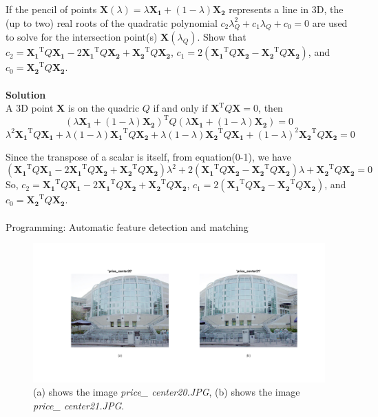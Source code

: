 \documentclass{assignment}
\begin{document}
\begin{problemlist}
If the pencil of points $\mathbf{X}(\lambda) = \lambda\mathbf{X_1} + (1 - \lambda)\mathbf{X_2}$ represents a line in 3D, the (up to two) real roots of the quadratic polynomial $c_2\lambda_Q^2+c_1\lambda_Q+c_0=0$ are used to solve for the intersection point(s) $\mathbf{X}(\lambda_Q)$. Show that $c_2=\mathbf{X_1}^\mathrm{T}Q\mathbf{X_1}-2\mathbf{X_1}^\mathrm{T}Q\mathbf{X_2}+\mathbf{X_2}^\mathrm{T}Q\mathbf{X_2}$, $c_1=2(\mathbf{X_1}^\mathrm{T}Q\mathbf{X_2}-\mathbf{X_2}^\mathrm{T}Q\mathbf{X_2})$, and $c_0=\mathbf{X_2}^\mathrm{T}Q\mathbf{X_2}$.
\\\\
\textbf{Solution}\\
A 3D point $\mathbf{X}$ is on the quadric $Q$ if and only if $\mathbf{X}^\mathrm{T}Q\mathbf{X}=0$, then
\begin{equation}
(\lambda\mathbf{X_1} + (1 - \lambda)\mathbf{X_2})^\mathrm{T}Q(\lambda\mathbf{X_1} + (1 - \lambda)\mathbf{X_2})=0
\end{equation}
\begin{equation}
\lambda^2\mathbf{X_1}^\mathrm{T}Q\mathbf{X_1}+
\lambda(1-\lambda)\mathbf{X_1}^\mathrm{T}Q\mathbf{X_2}+
\lambda(1-\lambda)\mathbf{X_2}^\mathrm{T}Q\mathbf{X_1}+
(1-\lambda)^2\mathbf{X_2}^\mathrm{T}Q\mathbf{X_2}=0
\end{equation}

Since the transpose of a scalar is itself, from equation(0-1), we have
\begin{equation}
(\mathbf{X_1}^\mathrm{T}Q\mathbf{X_1}-2\mathbf{X_1}^\mathrm{T}Q\mathbf{X_2}+\mathbf{X_2}^\mathrm{T}Q\mathbf{X_2})\lambda^2+
2(\mathbf{X_1}^\mathrm{T}Q\mathbf{X_2}-\mathbf{X_2}^\mathrm{T}Q\mathbf{X_2})\lambda+
\mathbf{X_2}^\mathrm{T}Q\mathbf{X_2}=0
\end{equation}
So, $c_2=\mathbf{X_1}^\mathrm{T}Q\mathbf{X_1}-2\mathbf{X_1}^\mathrm{T}Q\mathbf{X_2}+\mathbf{X_2}^\mathrm{T}Q\mathbf{X_2}$, $c_1=2(\mathbf{X_1}^\mathrm{T}Q\mathbf{X_2}-\mathbf{X_2}^\mathrm{T}Q\mathbf{X_2})$, and $c_0=\mathbf{X_2}^\mathrm{T}Q\mathbf{X_2}$.
\\\\
\pbitem Programming: Automatic feature detection and matching

\begin{figure}[H]
  \includegraphics[width=\textwidth]{InputImage}
\caption{(a) shows the image \emph{price\_ center20.JPG}, (b) shows the image \emph{price\_ center21.JPG}.}
\label{fig:images}
\end{figure}


\end{problemlist}
\end{document}
